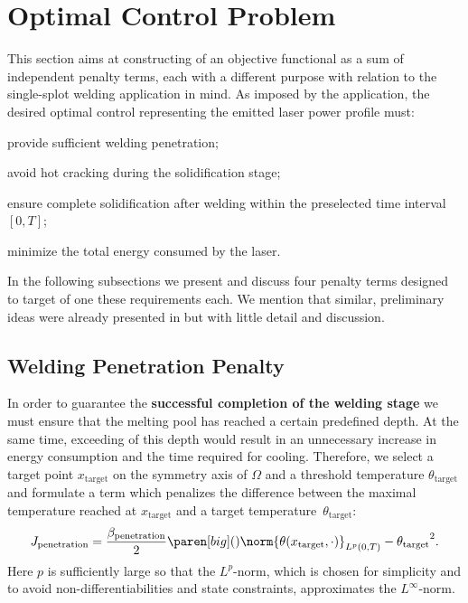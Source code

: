 \section{Optimal Control Problem}
\label{sec:optimal_control_problem}

This section aims at constructing of an objective functional as a sum of independent penalty terms, each with a different purpose with relation to the single-splot welding application in mind.
As imposed by the application, the desired optimal control representing the emitted laser power profile must:
\begin{enumeratearabic}
	\item 
		provide sufficient welding penetration;
	\item 
		avoid hot cracking during the solidification stage;
	\item 
		ensure complete solidification after welding within the preselected time interval~$[0,T]$;
	\item 
		minimize the total energy consumed by the laser.
\end{enumeratearabic}

In the following subsections we present and discuss four penalty terms designed to target of one these requirements each.
We mention that similar, preliminary ideas were already presented in \cite{BergmannBieleninHerzogHildebrandRiedelSchrickerTrunkWorthmann:2017:1} but with little detail and discussion.


\subsection{Welding Penetration Penalty}
\label{subsec:welding_penetration}

In order to guarantee the \textbf{successful completion of the welding stage} we must ensure that the melting pool has reached a certain predefined depth. 
At the same time, exceeding of this depth would result in an unnecessary increase in energy consumption and the time required for cooling.
Therefore, we select a target point $x_{\text{target}}$ on the symmetry axis of $\Omega$ and a threshold temperature $\theta_{\text{target}}$ and formulate a term which penalizes the difference between the maximal temperature reached at $x_{\text{target}}$ and a target temperature~$\theta_{\text{target}}$:
\begin{equation} \label{eq:J_penetration}
	J_{\text{penetration}} 
	= 
	\frac{\beta_\text{penetration}}{2} \paren[big](){\norm{\theta(x_{\text{target}},\cdot)}_{L^p(0,T)} - \theta_{\text{target}}}^2
	.
\end{equation}
Here $p$ is sufficiently large so that the $L^p$-norm, which is chosen for simplicity and to avoid non-differentiabilities and state constraints, approximates the $L^\infty$-norm.


